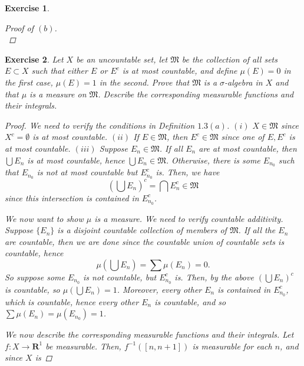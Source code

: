 \documentclass[10pt,letterpaper]{amsart}
\newtheorem{exercise}{Exercise}[section]
\theoremstyle{definition}
\theoremstyle{remark}
\numberwithin{equation}{exercise}
\begin{document}
\begin{multicols}{2}
\begin{exercise}
\begin{proof}[Proof of $(b)$]
\begin{equation*}
      \end{equation*}
    \end{proof}
  \end{exercise}
  \begin{exercise}
    Let $X$ be an uncountable set, let $\mathfrak{M}$ be the collection of all
    sets $E \subset X$ such that either $E$ or $E^c$ is at most countable, and
    define $\mu(E) = 0$ in the first case, $\mu(E) = 1$ in the second. Prove
    that $\mathfrak{M}$ is a $\sigma$-algebra in $X$ and that $\mu$ is a measure
    on $\mathfrak{M}$. Describe the corresponding measurable functions and their
    integrals.
    \begin{proof}
      We need to verify the conditions in Definition $1.3(a)$.
      $(i)$ $X \in \mathfrak{M}$ since $X^c = \emptyset$ is at most countable.
      $(ii)$ If $E \in \mathfrak{M}$, then $E^c \in \mathfrak{M}$ since one of
      $E,E^c$ is at most countable.
      $(iii)$ Suppose $E_n \in \mathfrak{M}$. If all $E_n$ are at most
      countable, then $\bigcup E_n$ is at most countable, hence $\bigcup E_n \in
      \mathfrak{M}$. Otherwise, there is some $E_{n_0}$ such that $E_{n_0}$ is
      not at most countable but $E_{n_0}^c$ is. Then, we have
      \begin{equation*}
        \left(\bigcup E_n\right)^c = \bigcap E_n^c \in \mathfrak{M}
      \end{equation*}
      since this intersection is contained in $E_{n_0}^c$.
      \par We now want to show $\mu$ is a measure. We need to verify countable
      additivity. Suppose $\{E_n\}$ is a disjoint countable collection of
      members of $\mathfrak{M}$. If all the $E_n$ are countable, then we are
      done since the countable union of countable sets is countable, hence
      \begin{equation*}
        \mu\!\left( \bigcup E_n \right) = \sum \mu(E_n) = 0.
      \end{equation*}
      So suppose some $E_{n_0}$ is not countable, but $E_{n_0}^c$ is. Then, by
      the above $\left(\bigcup E_n\right)^c$ is countable, so
      $\mu\!\left(\bigcup E_n\right) = 1$. Moreover, every other $E_n$ is
      contained in $E_{n_0}^c$, which is countable, hence every other $E_n$ is
      countable, and so $\sum \mu(E_n) = \mu(E_{n_0}) = 1$.
      \par We now describe the corresponding measurable functions and their
      integrals. Let $f \colon X \to \mathbf{R}^1$ be measurable. Then,
      $f^{-1}([n,n+1])$ is measurable for each $n$, and since $X$ is

\end{proof}
\end{exercise}
\end{multicols}
\end{document}
